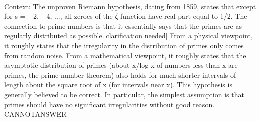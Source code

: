 \documentclass[11pt,a4paper, onecolumn]{article}
\begin{document}
\\ Context: The unproven Riemann hypothesis, dating from 1859, states that except for s = −2, −4, ..., all zeroes of the ζ-function have real part equal to 1/2. The connection to prime numbers is that it essentially says that the primes are as regularly distributed as possible.[clarification needed] From a physical viewpoint, it roughly states that the irregularity in the distribution of primes only comes from random noise. From a mathematical viewpoint, it roughly states that the asymptotic distribution of primes (about x/log x of numbers less than x are primes, the prime number theorem) also holds for much shorter intervals of length about the square root of x (for intervals near x). This hypothesis is generally believed to be correct. In particular, the simplest assumption is that primes should have no significant irregularities without good reason. CANNOTANSWER
\end{document}
